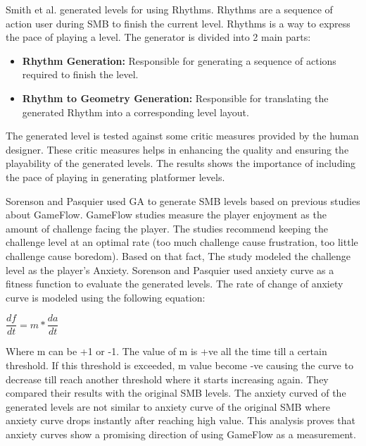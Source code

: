 Smith et al.\cite{rythmBasedGeneration} generated levels for  using Rhythms. Rhythms are a sequence of action user during SMB to finish the current level. Rhythms is a way to express the pace of playing a level. The generator is divided into 2 main parts: 
\begin{itemize} \itemsep0pt \parskip0pt 
	\item \textbf{Rhythm Generation:} Responsible for generating a sequence of actions required to finish the level.
	\item \textbf{Rhythm to Geometry Generation:} Responsible for translating the generated Rhythm into a corresponding level layout.
\end{itemize}
The generated level is tested against some critic measures provided by the human designer. These critic measures helps in enhancing the quality and ensuring the playability of the generated levels. The results shows the importance of including the pace of playing in generating platformer levels.\\\par

Sorenson and Pasquier\cite{smbEvolutionFun} used GA to generate SMB levels based on previous studies about GameFlow\cite{gameFlow1, gameFlow2, gameFlow3}. GameFlow studies measure the player enjoyment as the amount of challenge facing the player. The studies recommend keeping the challenge level at an optimal rate (too much challenge cause frustration, too little challenge cause boredom). Based on that fact, The study modeled the challenge level as the player's Anxiety. Sorenson and Pasquier used anxiety curve as a fitness function to evaluate the generated levels. The rate of change of anxiety curve is modeled using the following equation:
\begin{center}
$\dfrac{df}{dt} = m * \dfrac{da}{dt}$
\end{center}
Where m can be +1 or -1. The value of m is +ve all the time till a certain threshold. If this threshold is exceeded, m value become -ve causing the curve to decrease till reach another threshold where it starts increasing again. They compared their results with the original SMB levels. The anxiety curved of the generated levels are not similar to anxiety curve of the original SMB where anxiety curve drops instantly after reaching high value. This analysis proves that anxiety curves show a promising direction of using GameFlow as a measurement.\\\par

